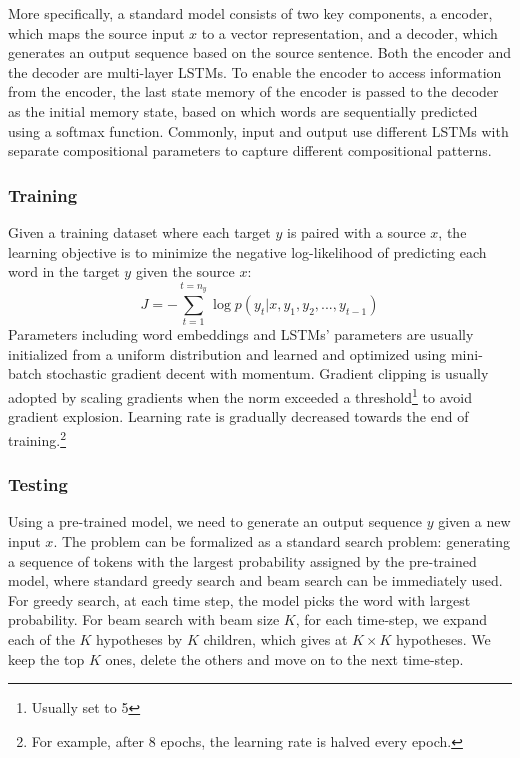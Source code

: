 More specifically, a standard \sts model consists of two key components, a encoder, which maps the source input $x$ to a vector representation, and a decoder, which generates an output sequence based on the source sentence. 
Both the encoder and the decoder are multi-layer LSTMs. To enable the encoder to access information from the encoder, the last state memory of the encoder is passed 
to the decoder as the initial memory state, based on which words are sequentially predicted using a softmax function. 
Commonly, input and output use different LSTMs with separate compositional parameters to capture different compositional patterns. 
\subsubsection{Training}
Given a training dataset where each target $y$ is paired with a source $x$, the learning objective is to minimize the negative log-likelihood of predicting each word in the target $y$ given the source $x$:
\begin{equation}
J=-\sum_{t=1}^{t=n_y} \log p(y_t|x,y_1,y_2,...,y_{t-1})
\end{equation}
Parameters including word embeddings and LSTMs' parameters are usually initialized from a uniform distribution and learned 
and optimized using mini-batch stochastic gradient decent with momentum. 
Gradient clipping is usually adopted by  scaling gradients when the norm exceeded a threshold\footnote{Usually set to 5} to avoid gradient explosion.
Learning rate is gradually decreased towards the end of training.\footnote{For example, after 8 epochs, the learning rate is halved every epoch.}

\subsubsection{Testing}
Using a pre-trained model, we need to generate an output sequence $y$ given a new input $x$. The problem can be formalized as a standard search problem: generating 
a sequence of tokens with the largest probability assigned by the pre-trained model, where standard
greedy search and beam search can be immediately used. 
For greedy search, at each time step, the model picks the word with largest probability. 
For beam search with beam size $K$, 
for each time-step, we expand each of the $K$  hypotheses by $K$ children, which gives at $K\times K$ hypotheses. We keep the top $K$ ones, delete the others and move on to the next time-step. 



